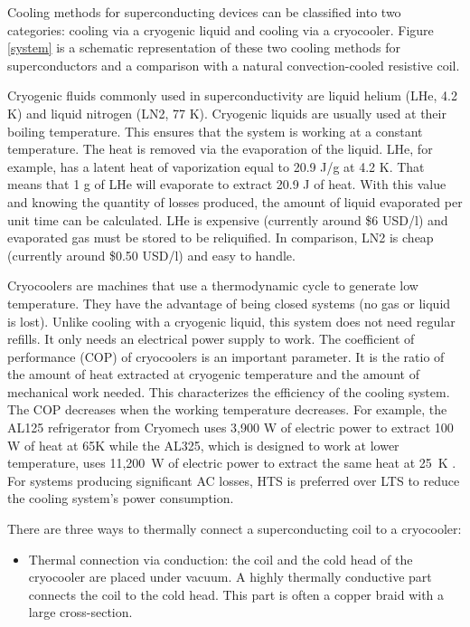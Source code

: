 \documentclass{ws-jmrr}
\begin{document}
\begin{multicols}{2}
Cooling methods for superconducting devices can be classified into two categories: cooling via a cryogenic liquid and cooling via a cryocooler. 
 Figure \ref{system} is a schematic representation of these two cooling methods for superconductors and a comparison with a natural convection-cooled resistive coil.\par
Cryogenic fluids commonly used in superconductivity are liquid helium (LHe, 4.2 K) and liquid nitrogen (LN2, 77 K). 
 Cryogenic liquids are usually used at their boiling temperature. 
  This ensures that the system is working at a constant temperature. 
   The heat is removed via the evaporation of the liquid. 
   LHe, for example, has a latent heat of vaporization equal to 20.9 J/g at 4.2 K. 
   That means that 1 g of LHe will evaporate to extract 20.9 J of heat. 
   With this value and knowing the quantity of losses produced, the amount of liquid evaporated per unit time can be calculated. 
   LHe is expensive (currently around \$6 USD/l) and evaporated gas must be stored to be reliquified. 
   In comparison, LN2 is cheap (currently around \$0.50 USD/l) and easy to handle.\par
Cryocoolers are machines that use a thermodynamic cycle to generate low temperature. They have the advantage of being closed systems (no gas or liquid is lost). Unlike cooling with a cryogenic liquid, this system does not need regular refills. It only needs an electrical power supply to work. The coefficient of performance (COP) of cryocoolers is an important parameter. It is the ratio of the amount of heat extracted at cryogenic temperature and the amount of mechanical work needed. This characterizes the efficiency of the cooling system. The COP decreases when the working temperature decreases. For example, the AL125 refrigerator from Cryomech uses 3,900 W of electric power to extract 100 W of heat at 65K while the AL325, which is designed to work at lower temperature, uses 11,200~W of electric power to extract the same heat at 25~K \cite{WinNT}. 
 For systems producing significant AC losses, HTS is preferred over LTS to reduce the cooling system's power consumption.\par
There are three ways to thermally connect a superconducting coil to a cryocooler:
\begin{itemize}[leftmargin=*]
\item Thermal connection via conduction: the coil and the cold head of the cryocooler are placed under vacuum. A highly thermally conductive part connects the coil to the cold head. This part is often a copper braid with a large cross-section.

\end{itemize}
\end{multicols}
\end{document}
